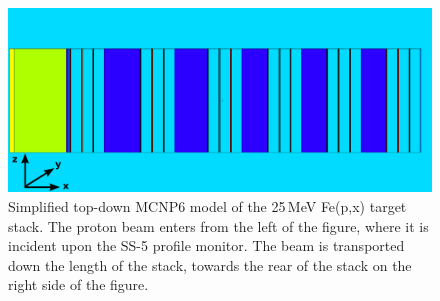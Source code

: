 \begin{figure}
 \centering
 \includegraphics[trim = 0mm 0mm 2mm 0mm, clip,width=0.75\columnwidth]{./figures/ipf_stack_nolabels_axes.PNG}
\caption{Simplified top-down MCNP6 model of the 25\,MeV  Fe(p,x) target stack. The  proton beam enters from the left of the figure, where it is incident upon the SS-5 profile monitor. The beam is transported down the length of the stack, towards the rear of the stack on the right side of the figure.
}
 \label{fig:fe_vised_25}
\end{figure}




% 
% 
% 
% 



